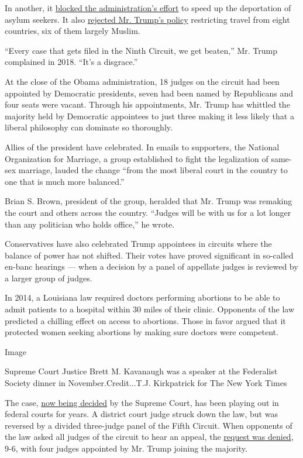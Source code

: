In another, it
\href{https://www.nytimes.com/2019/03/07/us/asylum-seekers-ninth-circuit.html}{blocked
the administration's effort} to speed up the deportation of asylum
seekers. It also
\href{https://www.nytimes.com/2017/12/22/us/travel-ban-court.html}{rejected
Mr. Trump's policy} restricting travel from eight countries, six of them
largely Muslim.

``Every case that gets filed in the Ninth Circuit, we get beaten,'' Mr.
Trump complained in 2018. ``It's a disgrace.''

At the close of the Obama administration, 18 judges on the circuit had
been appointed by Democratic presidents, seven had been named by
Republicans and four seats were vacant. Through his appointments, Mr.
Trump has whittled the majority held by Democratic appointees to just
three making it less likely that a liberal philosophy can dominate so
thoroughly.

Allies of the president have celebrated. In emails to supporters, the
National Organization for Marriage, a group established to fight the
legalization of same-sex marriage, lauded the change ``from the most
liberal court in the country to one that is much more balanced.''

Brian S. Brown, president of the group, heralded that Mr. Trump was
remaking the court and others across the country. ``Judges will be with
us for a lot longer than any politician who holds office,'' he wrote.

Conservatives have also celebrated Trump appointees in circuits where
the balance of power has not shifted. Their votes have proved
significant in so-called en-banc hearings --- when a decision by a panel
of appellate judges is reviewed by a larger group of judges.

In 2014, a Louisiana law required doctors performing abortions to be
able to admit patients to a hospital within 30 miles of their clinic.
Opponents of the law predicted a chilling effect on access to abortions.
Those in favor argued that it protected women seeking abortions by
making sure doctors were competent.

Image

Supreme Court Justice Brett M. Kavanaugh was a speaker at the Federalist
Society dinner in November.Credit...T.J. Kirkpatrick for The New York
Times

The case,
\href{https://www.nytimes.com/2020/03/04/us/supreme-court-abortion.html}{now
being decided} by the Supreme Court, has been playing out in federal
courts for years. A district court judge struck down the law, but was
reversed by a divided three-judge panel of the Fifth Circuit. When
opponents of the law asked all judges of the circuit to hear an appeal,
the
\href{http://www.ca5.uscourts.gov/opinions/pub/17/17-30397-CV1.pdf}{request
was denied}, 9-6, with four judges appointed by Mr. Trump joining the
majority.

